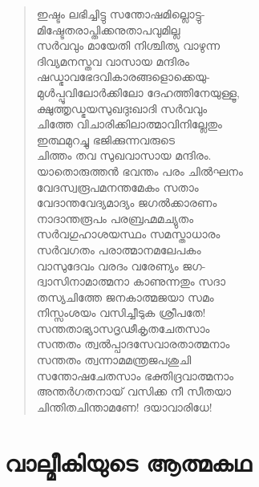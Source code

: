 \begin{verse}
ഇഷ്ടം ലഭിച്ചിട്ടു സന്തോഷമില്ലൊട്ടു-\\
മിഷ്ടേതരാപ്തിക്കനുതാപവുമില്ല\\
സര്‍വവും മായേതി നിശ്ചിത്യ വാഴുന്ന\\
ദിവ്യമനസ്തവ വാസായ മന്ദിരം\\
ഷഡ്ഭാവഭേദവികാരങ്ങളൊക്കെയു-\\
മുള്‍പ്പൂവിലോര്‍ക്കിലോ ദേഹത്തിനേയുള്ളൂ,\\
ക്ഷുത്തൃഡ്ഭയസുഖദുഃഖാദി സര്‍വവും\\
ചിത്തേ വിചാരിക്കിലാത്മാവിനില്ലേതും\\
ഇത്ഥമുറച്ചു ഭജിക്കുന്നവരുടെ\\
ചിത്തം തവ സുഖവാസായ മന്ദിരം.\\
യാതൊരുത്തന്‍ ഭവന്തം പരം ചില്‍ഘനം\\
വേദസ്വരൂപമനന്തമേകം സതാം\\
വേദാന്തവേദ്യമാദ്യം ജഗല്‍ക്കാരണം\\
നാദാന്തരൂപം പരബ്രഹ്മമച്യുതം\\
സര്‍വഗുഹാശയസ്ഥം സമസ്താധാരം\\
സര്‍വഗതം പരാത്മാനമലേപകം\\
വാസുദേവം വരദം വരേണ്യം ജഗ-\\
ദ്വാസിനാമാത്മനാ കാണുന്നതും സദാ\\
തസ്യചിത്തേ ജനകാത്മജയാ സമം\\
നിസ്സംശയം വസിച്ചീടുക ശ്രീപതേ!\\
സന്തതാഭ്യാസദൃഢീകൃതചേതസാം\\
സന്തതം ത്വല്‍പ്പാദസേവാരതാത്മനാം\\
സന്തതം ത്വന്നാമമന്ത്രജപശുചി\\
സന്തോഷചേതസാം ഭക്തിദ്രവാത്മനാം\\
അന്തര്‍ഗതനായ് വസിക്ക നീ സീതയാ\\
ചിന്തിതചിന്താമണേ! ദയാവാരിധേ!
\end{verse}


\section{വാല്മീകിയുടെ ആത്മകഥ}

